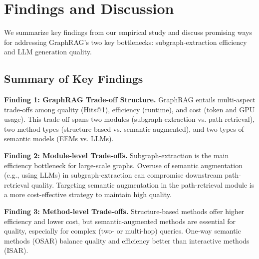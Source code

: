 
\section{Findings and Discussion} 

We summarize key findings from our empirical study and discuss promising ways for addressing GraphRAG's two key bottlenecks: subgraph-extraction efficiency and LLM generation quality.



\subsection{Summary of Key Findings}
{\bf Finding 1: GraphRAG Trade-off Structure.} GraphRAG entails multi-aspect trade-offs among quality (Hits@1), efficiency (runtime), and cost (token and GPU usage). This trade-off spans two modules (subgraph-extraction vs. path-retrieval), two method types (structure-based vs. semantic-augmented), and two types of semantic models (EEMs vs. LLMs).

    \textbf{Finding 2: Module-level Trade-offs.} Subgraph-extraction is the main efficiency bottleneck for large-scale graphs. Overuse of semantic augmentation (e.g., using LLMs) in subgraph-extraction can compromise downstream path-retrieval quality. Targeting semantic augmentation in the path-retrieval module is a more cost-effective strategy to maintain high quality.
        
    \textbf{Finding 3: Method-level Trade-offs.} Structure-based methods offer higher efficiency and lower cost, but semantic-augmented methods are essential for quality, especially for complex (two- or multi-hop) queries. 
    One-way semantic methods (OSAR) balance quality and efficiency better than interactive methods (ISAR).

